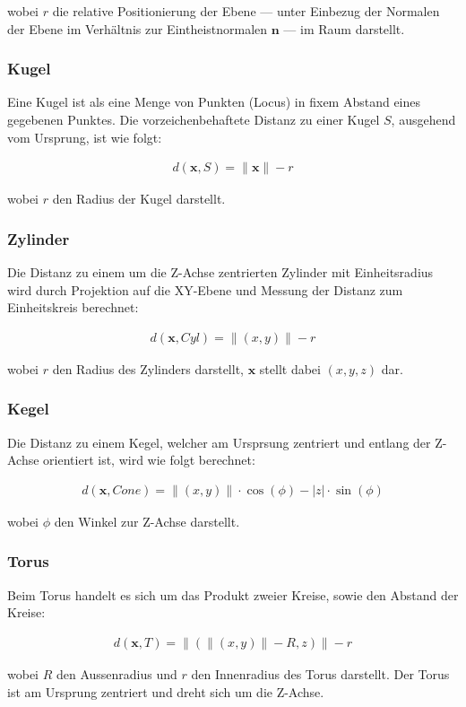 wobei $r$ die relative Positionierung der Ebene --- unter Einbezug der Normalen der Ebene im Verhältnis zur Eintheistnormalen $\bm{n}$ --- im Raum darstellt.

\subsubsection{Kugel}
\label{ssubsec:implicit_surfaces_primitives_sphere}

Eine Kugel ist als eine Menge von Punkten (Locus) in fixem Abstand eines gegebenen Punktes. Die vorzeichenbehaftete Distanz zu einer Kugel $S$, ausgehend vom Ursprung, ist wie folgt:

\begin{gather}
    d(\bm{x}, S) = \|\bm{x}\| - r
\end{gather}

wobei $r$ den Radius der Kugel darstellt.

\subsubsection{Zylinder}
\label{ssubsec:implicit_surfaces_primitives_cylinder}

Die Distanz zu einem um die Z-Achse zentrierten Zylinder mit Einheitsradius wird durch Projektion auf die XY-Ebene und Messung der Distanz zum Einheitskreis berechnet:

\begin{gather}
    d(\bm{x}, Cyl) = \|(x, y)\| - r
\end{gather}

wobei $r$ den Radius des Zylinders darstellt, $\bm{x}$ stellt dabei $(x,y,z)$ dar.

\subsubsection{Kegel}
\label{ssubsec:implicit_surfaces_primitives_cone}

Die Distanz zu einem Kegel, welcher am Ursprsung zentriert und entlang der Z-Achse orientiert ist, wird wie folgt berechnet:

\begin{gather}
    d(\bm{x}, Cone) = \|(x, y)\| \cdot \cos(\phi) - |z| \cdot \sin(\phi)
\end{gather}

wobei $\phi$ den Winkel zur Z-Achse darstellt.

\subsubsection{Torus}
\label{ssubsec:implicit_surfaces_primitives_torus}

Beim Torus handelt es sich um das Produkt zweier Kreise, sowie den Abstand der Kreise:

\begin{gather}
    d(\bm{x}, T) = \|(\|(x, y)\| - R, z)\| - r
\end{gather}

wobei $R$ den Aussenradius und $r$ den Innenradius des Torus darstellt. Der Torus ist am Ursprung zentriert und dreht sich um die Z-Achse.
